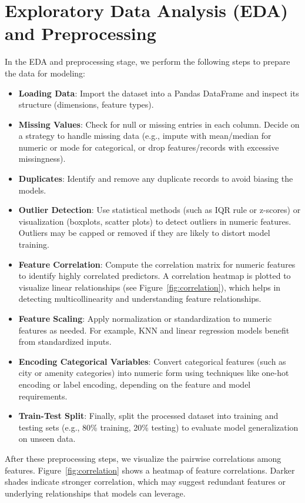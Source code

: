 \documentclass[12pt]{article}
\begin{document}
\section{Exploratory Data Analysis (EDA) and Preprocessing}
In the EDA and preprocessing stage, we perform the following steps to prepare the data for modeling:
\begin{itemize}
    \item \textbf{Loading Data}: Import the dataset into a Pandas DataFrame and inspect its structure (dimensions, feature types).
    \item \textbf{Missing Values}: Check for null or missing entries in each column. Decide on a strategy to handle missing data (e.g., impute with mean/median for numeric or mode for categorical, or drop features/records with excessive missingness).
    \item \textbf{Duplicates}: Identify and remove any duplicate records to avoid biasing the models.
    \item \textbf{Outlier Detection}: Use statistical methods (such as IQR rule or z-scores) or visualization (boxplots, scatter plots) to detect outliers in numeric features. Outliers may be capped or removed if they are likely to distort model training.
    \item \textbf{Feature Correlation}: Compute the correlation matrix for numeric features to identify highly correlated predictors. A correlation heatmap is plotted to visualize linear relationships (see Figure~\ref{fig:correlation}), which helps in detecting multicollinearity and understanding feature relationships.
    \item \textbf{Feature Scaling}: Apply normalization or standardization to numeric features as needed. For example, KNN and linear regression models benefit from standardized inputs.
    \item \textbf{Encoding Categorical Variables}: Convert categorical features (such as city or amenity categories) into numeric form using techniques like one-hot encoding or label encoding, depending on the feature and model requirements.
    \item \textbf{Train-Test Split}: Finally, split the processed dataset into training and testing sets (e.g., 80\% training, 20\% testing) to evaluate model generalization on unseen data.
\end{itemize}

After these preprocessing steps, we visualize the pairwise correlations among features. Figure~\ref{fig:correlation} shows a heatmap of feature correlations. Darker shades indicate stronger correlation, which may suggest redundant features or underlying relationships that models can leverage.
\end{document}
